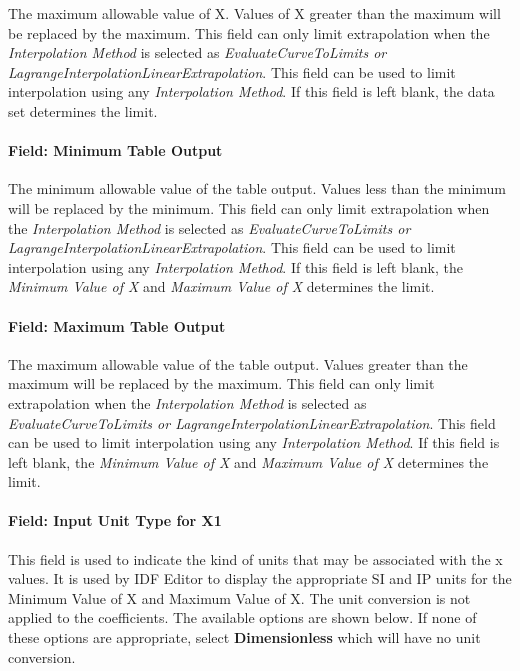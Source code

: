 The maximum allowable value of X. Values of X greater than the maximum will be replaced by the maximum. This field can only limit extrapolation when the \emph{Interpolation Method} is selected as \emph{EvaluateCurveToLimits or LagrangeInterpolationLinearExtrapolation}. This field can be used to limit interpolation using any \emph{Interpolation Method}. If this field is left blank, the data set determines the limit.

\paragraph{Field: Minimum Table Output}\label{field-minimum-table-output}

The minimum allowable value of the table output. Values less than the minimum will be replaced by the minimum. This field can only limit extrapolation when the \emph{Interpolation Method} is selected as \emph{EvaluateCurveToLimits or LagrangeInterpolationLinearExtrapolation}. This field can be used to limit interpolation using any \emph{Interpolation Method}. If this field is left blank, the \emph{Minimum Value of X} and \emph{Maximum Value of X} determines the limit.

\paragraph{Field: Maximum Table Output}\label{field-maximum-table-output}

The maximum allowable value of the table output. Values greater than the maximum will be replaced by the maximum. This field can only limit extrapolation when the \emph{Interpolation Method} is selected as \emph{EvaluateCurveToLimits or LagrangeInterpolationLinearExtrapolation}. This field can be used to limit interpolation using any \emph{Interpolation Method}. If this field is left blank, the \emph{Minimum Value of X} and \emph{Maximum Value of X} determines the limit.

\paragraph{Field: Input Unit Type for X1}\label{field-input-unit-type-for-x1}

This field is used to indicate the kind of units that may be associated with the x values. It is used by IDF Editor to display the appropriate SI and IP units for the Minimum Value of X and Maximum Value of X. The unit conversion is not applied to the coefficients. The available options are shown below. If none of these options are appropriate, select \textbf{Dimensionless} which will have no unit conversion.

